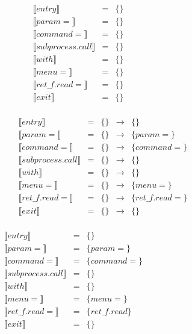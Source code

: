\newcommand{\constraint}[1]{
\llbracket #1 \rrbracket
  }

\newcommand{\assignconstraint}[3]{
#1 ~ \downarrow ~ #2 ~ \cup ~ #3
  }




\begin{frame}
\[
\begin{array}{lclcl}
  \constraint{entry} & = & \{\} &\phantom{hahahahhh}\\
  \constraint{param =} & = & \{\} &\\
  \constraint{command =} & = & \{\}&\\
  \constraint{subprocess.call} & = & \{\}&\\
  \constraint{with} & = & \{\}&\\
  \constraint{menu =} & = & \{\}&\\
  \constraint{ret\_f.read =} & = & \{\}&\\
  \constraint{exit} & = & \{\}&\\
\end{array}
\]
\end{frame}

\begin{frame}
\[
\begin{array}{lclcl}
  \constraint{entry} & = & \{\} & \rightarrow & \{\}\\
  \constraint{param =} & = & \{\} & \rightarrow &\{param =\}\\
  \constraint{command =} & = & \{\}& \rightarrow &\{command =\}\\
  \constraint{subprocess.call} & = & \{\}& \rightarrow &\{\}\\
  \constraint{with} & = & \{\}&\rightarrow & \{\}\\
  \constraint{menu =} & = & \{\}& \rightarrow & \{menu =\}\\
  \constraint{ret\_f.read =} & = & \{\}&\rightarrow & \{ret\_f.read =\}\\
  \constraint{exit} & = & \{\}&\rightarrow & \{\}\\
\end{array}
\]
\end{frame}

\begin{frame}
\[
\begin{array}{lclcl}
  \constraint{entry} & = &  \{\} & \phantom{\rightarrow} & \phantom{hahahaha}\\
  \constraint{param =} & = & \{param =\}&  & \\ 
  \constraint{command =} & = &\{command =\}&  & \\
  \constraint{subprocess.call} & = & \{\}&  & \\
  \constraint{with} & = & \{\}&  & \\
  \constraint{menu =} & = &  \{menu =\}&  & \\
  \constraint{ret\_f.read =} & = & \{ret\_f.read\}&  & \\
  \constraint{exit} & = & \{\}&  & \\
\end{array}
\]
\end{frame}

